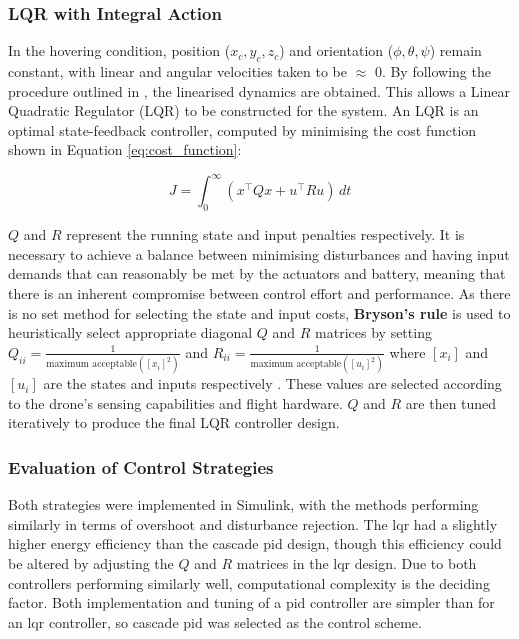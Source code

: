 \subsubsection{LQR with Integral Action}

In the hovering condition, position (\(x_c, y_c, z_c\)) and orientation (\(\phi, \theta, \psi\)) remain constant, with linear and angular velocities taken to be $\approx$ 0. By following the procedure outlined in \cite{cengiz2024quadcopter}, the linearised dynamics are obtained. This allows a Linear Quadratic Regulator (LQR) to be constructed for the system. An LQR is an optimal state-feedback controller, computed by minimising the cost function shown in Equation \ref{eq:cost_function}:

\begin{equation} \label{eq:cost_function}
J = \int_0^\infty \left( x^\top Q x + u^\top R u \right) \, dt 
\end{equation}

$Q$ and $R$ represent the running state and input penalties respectively. It is necessary to achieve a balance between minimising disturbances and having input demands that can reasonably be met by the actuators and battery, meaning that there is an inherent compromise between control effort and performance. As there is no set method for selecting the state and input costs, \textbf{Bryson's rule} is used to heuristically select appropriate diagonal $Q$ and $R$ matrices by setting $Q_{ii} = \frac{1}{\text{maximum acceptable}( [x_i]^2 )}$ and $R_{ii} = \frac{1}{\text{maximum acceptable}( [u_i]^2 )}$ where $[x_i]$ and $[u_i]$ are the states and inputs respectively \cite{chibum2014adv09designofsfb1}. These values are selected according to the drone's sensing capabilities and flight hardware. $Q$ and $R$ are then tuned iteratively to produce the final LQR controller design.

\subsubsection{Evaluation of Control Strategies}

Both strategies were implemented in Simulink, with the methods performing similarly in terms of overshoot and disturbance rejection. The \gls{lqr} had a slightly higher energy efficiency than the cascade \gls{pid} design, though this efficiency could be altered by adjusting the $Q$ and $R$ matrices in the \gls{lqr} design. Due to both controllers performing similarly well, computational complexity is the deciding factor. Both implementation and tuning of a \gls{pid} controller are simpler than for an \gls{lqr} controller, so cascade \gls{pid} was selected as the control scheme.

